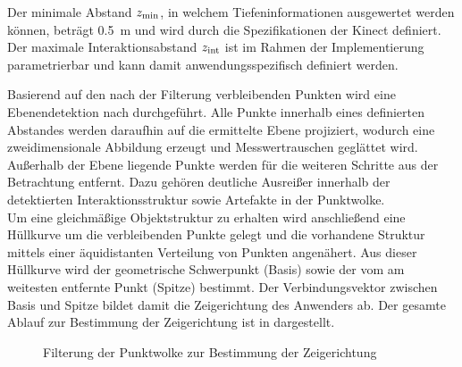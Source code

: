 \prever{
}
Der minimale Abstand $z_{\mathrm{{min}}}$, in welchem Tiefeninformationen ausgewertet werden können, beträgt \SI{0,5}{\meter} und wird durch die Spezifikationen der Kinect definiert. Der maximale Interaktionsabstand $z_{\mathrm{{int}}}$ ist im Rahmen der Implementierung parametrierbar und kann damit anwendungsspezifisch definiert werden.\\



Basierend auf den nach der Filterung verbleibenden Punkten wird eine Ebenendetektion nach \cite{Fischler1981} durchgeführt. Alle Punkte innerhalb eines definierten Abstandes werden daraufhin auf die ermittelte Ebene projiziert, wodurch eine zweidimensionale Abbildung erzeugt und Messwertrauschen geglättet wird. Außerhalb der Ebene liegende Punkte werden für die weiteren Schritte aus der Betrachtung entfernt. Dazu gehören deutliche Ausreißer innerhalb der detektierten Interaktionsstruktur sowie Artefakte in der Punktwolke.\\

Um eine gleichmäßige Objektstruktur zu erhalten wird anschließend eine Hüllkurve um die verbleibenden Punkte gelegt und die vorhandene Struktur mittels einer äquidistanten Verteilung von Punkten angenähert. Aus dieser Hüllkurve wird der geometrische Schwerpunkt (Basis) sowie der vom \kps{} am weitesten entfernte Punkt (Spitze) bestimmt. Der Verbindungsvektor zwischen Basis und Spitze bildet damit die Zeigerichtung des Anwenders ab. Der gesamte Ablauf zur Bestimmung der Zeigerichtung ist in  dargestellt.\\

\begin{figure}[!ht]
	\begin{center}
	\hspace{5mm}
	\hspace{5mm}
	\caption{Filterung der Punktwolke zur Bestimmung der Zeigerichtung}
	\label{fig.intdir}
	\end{center}
\end{figure}

